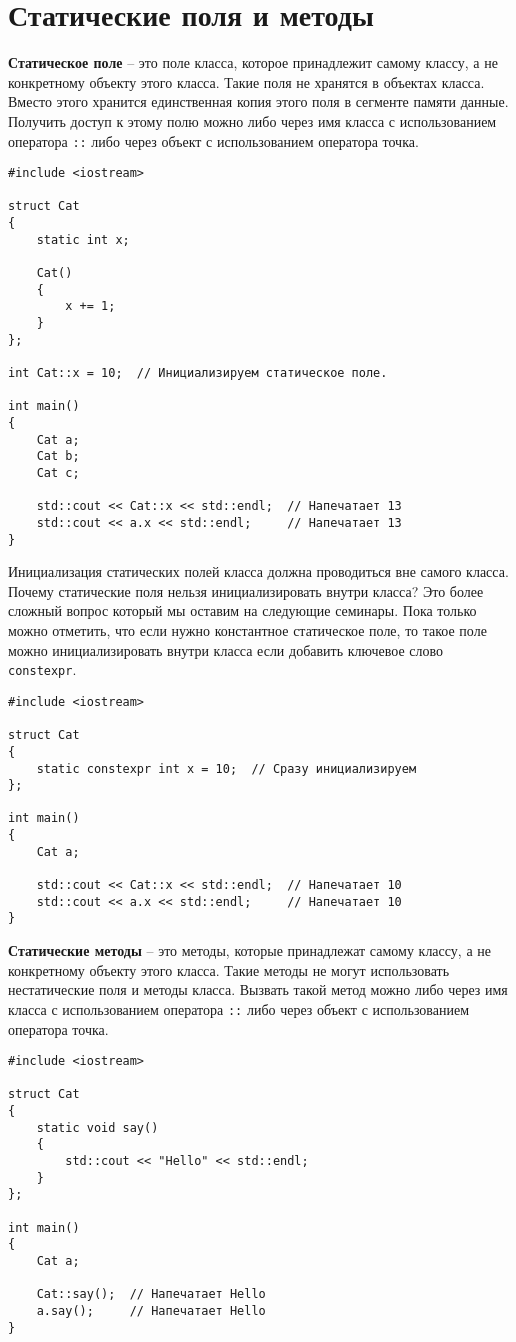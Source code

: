 \documentclass{article}
\begin{document}
\newpage
\section*{Статические поля и методы}
\textbf{Статическое поле} -- это поле класса, которое принадлежит самому классу, а не конкретному объекту этого класса. Такие поля не хранятся в объектах класса. Вместо этого хранится единственная копия этого поля в сегменте памяти данные. Получить доступ к этому полю можно либо через имя класса с использованием оператора \texttt{::} либо через объект с использованием оператора точка.
\begin{lstlisting}
#include <iostream>

struct Cat
{
	static int x;
	
	Cat()
	{
		x += 1;
	}
};

int Cat::x = 10;  // Инициализируем статическое поле.

int main()
{
	Cat a;
	Cat b;
	Cat c;
	
	std::cout << Cat::x << std::endl;  // Напечатает 13
	std::cout << a.x << std::endl;     // Напечатает 13
}
\end{lstlisting}

Инициализация статических полей класса должна проводиться вне самого класса. Почему статические поля нельзя инициализировать внутри класса? Это более сложный вопрос который мы оставим на следующие семинары. Пока только можно отметить, что если нужно константное статическое поле, то такое поле можно инициализировать внутри класса если добавить ключевое слово \texttt{constexpr}.
\begin{lstlisting}
#include <iostream>

struct Cat
{
	static constexpr int x = 10;  // Сразу инициализируем
};

int main()
{
	Cat a;
	
	std::cout << Cat::x << std::endl;  // Напечатает 10
	std::cout << a.x << std::endl;     // Напечатает 10
}
\end{lstlisting}

\newpage
\noindent \textbf{Статические методы} -- это методы, которые принадлежат самому классу, а не конкретному объекту этого класса. Такие методы не могут использовать нестатические поля и методы класса. Вызвать такой метод можно либо через имя класса с использованием оператора \texttt{::} либо через объект с использованием оператора точка.

\begin{lstlisting}
#include <iostream>

struct Cat
{
	static void say()
	{
		std::cout << "Hello" << std::endl;
	}
};

int main()
{
	Cat a;
	
	Cat::say();  // Напечатает Hello
	a.say();     // Напечатает Hello
}
\end{lstlisting}
\end{document}
